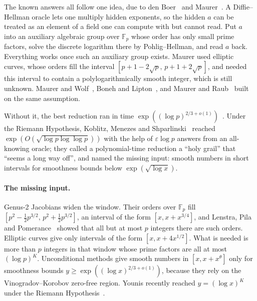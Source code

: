 \documentclass[11pt]{article}
\theoremstyle{remark}
\newcommand{\F}{\mathbb{F}}
\begin{document}
The known answers all follow one idea, due to den Boer~\cite{dB88} and Maurer~\cite{Mau94}. A
Diffie--Hellman oracle lets one multiply hidden exponents, so the hidden $a$ can be treated as an element of
a field one can compute with but cannot read. Put $a$ into an auxiliary algebraic group over $\F_p$ whose
order has only small prime factors, solve the discrete logarithm there by Pohlig--Hellman, and read $a$ back.
Everything works once such an auxiliary group exists. Maurer used elliptic curves, whose orders fill the
interval $[p+1-2\sqrt p,\,p+1+2\sqrt p]$, and needed this interval to contain a polylogarithmically smooth
integer, which is still unknown. Maurer and Wolf~\cite{MW99,Wol99}, Boneh and Lipton~\cite{BL96}, and Maurer
and Raub~\cite{MR07} built on the same assumption.

Without it, the best reduction ran in time
$\exp((\log p)^{2/3+o(1)})$~\cite{Wol99,MW00}. Under the Riemann Hypothesis, Koblitz, Menezes and
Shparlinski~\cite{KMS10} reached $\exp(O(\sqrt{\log p\log\log p}))$ with the help of $\varepsilon\log p$
answers from an all-knowing oracle; they called a polynomial-time reduction a ``holy grail'' that ``seems a
long way off'', and named the missing input: smooth numbers in short intervals for smoothness bounds below
$\exp(\sqrt{\log x})$.

\paragraph{The missing input.}
Genus-2 Jacobians widen the window. Their orders over $\F_p$ fill
$[p^2-\tfrac12p^{3/2},\,p^2+\tfrac12p^{3/2}]$, an interval of the form $[x,x+x^{3/4}]$, and Lenstra, Pila and
Pomerance~\cite{LPP02} showed that all but at most $p$ integers there are such orders. Elliptic curves give
only intervals of the form $[x,x+4x^{1/2}]$. What is needed is
more than $p$ integers in that window whose prime factors are all at most $(\log p)^{K}$. Unconditional
methods give smooth numbers in $[x,x+x^\theta]$ only for smoothness bounds
$y\ge\exp((\log x)^{2/3+o(1)})$, because they rely on the Vinogradov--Korobov zero-free region. Younis
recently reached $y=(\log x)^K$ under the Riemann Hypothesis~\cite{You24}.
\end{document}
